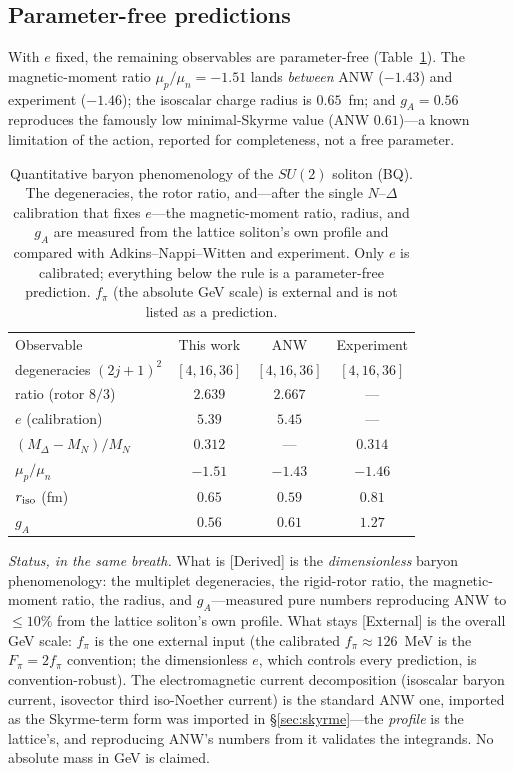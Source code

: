 \documentclass[aps,prd,reprint,nofootinbib,superscriptaddress,floatfix]{revtex4-2}
\theoremstyle{plain}
\newcommand{\Sderiv}{\textsf{[Derived]}}
\newcommand{\Sext}{\textsf{[External]}}
\newcommand{\su}[1]{SU(#1)}
\begin{document}
\subsection{Parameter-free predictions}
With $e$ fixed, the remaining observables are parameter-free
(Table~\ref{tab:baryon}). The magnetic-moment ratio $\mu_p/\mu_n=-1.51$ lands
\emph{between} ANW ($-1.43$) and experiment ($-1.46$); the isoscalar charge radius is
$0.65$~fm; and $g_A=0.56$ reproduces the famously low minimal-Skyrme value (ANW
$0.61$)---a known limitation of the action, reported for completeness, not a free
parameter.

\begin{table}[t]
\caption{Quantitative baryon phenomenology of the $\su2$ soliton (BQ). The
degeneracies, the rotor ratio, and---after the single $N$--$\Delta$ calibration that
fixes $e$---the magnetic-moment ratio, radius, and $g_A$ are measured from the
lattice soliton's own profile and compared with Adkins--Nappi--Witten and experiment.
Only $e$ is calibrated; everything below the rule is a parameter-free prediction.
$f_\pi$ (the absolute GeV scale) is external and is not listed as a prediction.}
\label{tab:baryon}
\begin{ruledtabular}
\begin{tabular}{lccc}
Observable & This work & ANW & Experiment \\
\colrule
degeneracies $(2j+1)^2$ & $[4,16,36]$ & $[4,16,36]$ & $[4,16,36]$ \\
ratio (rotor $8/3$) & $2.639$ & $2.667$ & --- \\
$e$ (calibration) & $5.39$ & $5.45$ & --- \\
\colrule
$(M_\Delta-M_N)/M_N$ & $0.312$ & --- & $0.314$ \\
$\mu_p/\mu_n$ & $-1.51$ & $-1.43$ & $-1.46$ \\
$r_{\rm iso}$ (fm) & $0.65$ & $0.59$ & $0.81$ \\
$g_A$ & $0.56$ & $0.61$ & $1.27$ \\
\end{tabular}
\end{ruledtabular}
\end{table}

\emph{Status, in the same breath.} What is \Sderiv{} is the \emph{dimensionless}
baryon phenomenology: the multiplet degeneracies, the rigid-rotor ratio, the
magnetic-moment ratio, the radius, and $g_A$---measured pure numbers reproducing ANW to
$\le10\%$ from the lattice soliton's own profile. What stays \Sext{} is the overall GeV
scale: $f_\pi$ is the one external input (the calibrated $f_\pi\approx126$~MeV is the
$F_\pi=2f_\pi$ convention; the dimensionless $e$, which controls every prediction, is
convention-robust). The electromagnetic current decomposition (isoscalar baryon
current, isovector third iso-Noether current) is the standard ANW one, imported as the
Skyrme-term form was imported in \S\ref{sec:skyrme}---the \emph{profile} is the
lattice's, and reproducing ANW's numbers from it validates the integrands. No absolute
mass in GeV is claimed.
\end{document}
